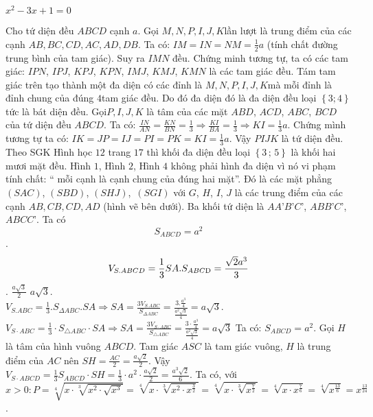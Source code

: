 \documentclass{article}
\begin{document}
$x^2-3x+1=0$
    
Cho tứ diện đều \(ABCD\) cạnh \(a\). Gọi \(M,N,P,I,J,K\)lần lượt là trung điểm của các cạnh \(AB,BC,CD,AC,AD,DB\).
Ta có: \(IM = IN = NM = \frac{1}{2}a\) (tính chất đường trung bình của tam giác). Suy ra \(IMN\) đều.
Chứng minh tương tự, ta có các tam giác: \(IPN\), \(IPJ\), \(KPJ\), \(KPN\), \(IMJ\), \(KMJ\), \(KMN\) là các tam giác đều.
Tám tam giác trên tạo thành một đa diện có các đỉnh là \(M,N,P,I,J,K\)mà mỗi đỉnh là đỉnh chung của đúng \(4\)tam giác đều. Do đó đa diện đó là đa diện đều loại \(\left\{ {3;4} \right\}\) tức là bát diện đều.
Gọi\(P,I,J,K\) là tâm của các mặt \(ABD\), \(ACD\), \(ABC\), \(BCD\) của tứ diện đều \(ABCD\).
Ta có: \(\frac{{IN}}{{AN}} = \frac{{KN}}{{BN}} = \frac{1}{3} \Rightarrow \frac{{KI}}{{BA}} = \frac{1}{3} \Rightarrow KI = \frac{1}{3}a\).
Chứng mình tương tự ta có: \(IK = JP = IJ = PI = PK = KI = \frac{1}{3}a\).
Vậy \(PIJK\) là tứ diện đều.
Theo SGK Hình học \(12\) trang \(17\) thì khối đa diện đều loại \(\left\{ {3\,;\,5} \right\}\) là khối hai mươi mặt đều.
Hình \(1\), Hình \(2\), Hình \(4\) không phải hình đa diện vì nó vi phạm tính chất: “ mỗi cạnh là cạnh chung của đúng hai mặt”.
Đó là các mặt phẳng \(\left( {SAC} \right)\), \(\left( {SBD} \right)\), \(\left( {SHJ} \right)\), \(\,\left( {SGI} \right)\) với \(G\), \(H\), \(I\), \(J\) là các trung điểm của các cạnh \(AB,\)\(CB,\)\(CD,\)\(AD\) (hình vẽ bên dưới).
Ba khối tứ diện là \(AA’B’C’\), \(ABB’C’\), \(ABCC’\).
Ta có \[{S_{ABCD}} = {a^2}\]. \[{V_{S.ABCD}} = \frac{1}{3}SA.{S_{ABC{\rm{D}}}} = \frac{{\sqrt 2 {a^3}}}{3}\].
\(\frac{a\sqrt{3}}{2}\)
\( a \sqrt{3}\).
\\
\({V_{S.ABC}} = \frac{1}{3}.{S_{\Delta ABC}}.SA \Rightarrow SA = \frac{{3{V_{S.ABC}}}}{{{S_{\Delta ABC}}}} = \frac{{3.\frac{{{a^3}}}{4}}}{{\frac{{{a^2}\sqrt 3 }}{4}}} = a\sqrt 3 \).
\(V_{S \cdot A B C}=\frac{1}{3} \cdot S_{\triangle A B C} \cdot S A \Rightarrow S A=\frac{3 V_{S \cdot A B C}}{S_{\triangle A B C}}=\frac{3 \cdot \frac{a^3}{4}}{\frac{a^2 \sqrt{3}}{4}}=a \sqrt{3}\)
Ta có: \(S_{A B C D}=a^2\).
Gọi \(H\) là tâm của hình vuông \(A B C D\). Tam giác \(A S C\) là tam giác vuông, \(H\) là trung điểm của \(A C\) nên \(S H=\frac{A C}{2}=\frac{a \sqrt{2}}{2}\).
Vậy \(V_{S \cdot A B C D}=\frac{1}{3} S_{A B C D} \cdot S H=\frac{1}{3} \cdot a^2 \cdot \frac{a \sqrt{2}}{2}=\frac{a^3 \sqrt{2}}{6}\).
Ta có, với \(x>0: P=\sqrt[4]{x \cdot \sqrt[3]{x^2 \cdot \sqrt{x^3}}}=\sqrt[4]{x \cdot \sqrt[3]{x^2 \cdot x^{\frac{3}{2}}}}=\sqrt[4]{x \cdot \sqrt[3]{x^{\frac{7}{2}}}}=\sqrt[4]{x \cdot x^{\frac{7}{6}}}=\sqrt[4]{x^{\frac{13}{6}}}=x^{\frac{13}{24}}\).
\end{document}
